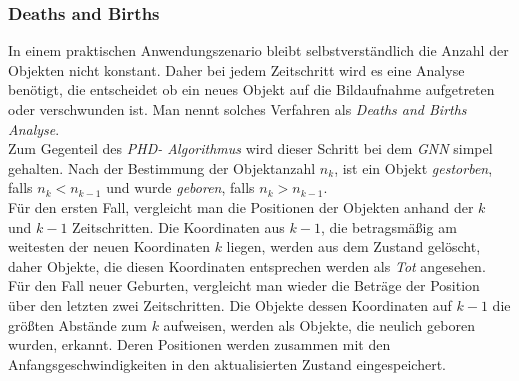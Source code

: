 \documentclass[10pt,a4paper]{article}
\begin{document}
\subsubsection{Deaths and Births}\label{subsub:GNNDeathBirth}
In einem praktischen Anwendungszenario bleibt selbstverständlich die Anzahl der Objekten nicht konstant. Daher bei jedem Zeitschritt wird es eine Analyse benötigt, die entscheidet ob ein neues Objekt auf die Bildaufnahme aufgetreten  oder verschwunden ist. Man nennt solches Verfahren als \textit{Deaths and Births Analyse}.\\
Zum Gegenteil des \textit{PHD- Algorithmus} wird dieser Schritt bei dem \textit{GNN } simpel gehalten. Nach der Bestimmung der Objektanzahl $n_k$, ist ein Objekt \textit{gestorben}, falls $n_k < n_{k-1}$ und wurde \textit{geboren}, falls $n_k > n_{k-1}$.\\
Für den ersten Fall, vergleicht man die Positionen der Objekten anhand der $k$ und $k-1$ Zeitschritten. Die Koordinaten aus $k-1$, die betragsmäßig am weitesten der neuen Koordinaten $k$ liegen, werden aus dem Zustand gelöscht, daher Objekte, die diesen Koordinaten entsprechen werden als \textit{Tot} angesehen.\\
Für den Fall neuer Geburten, vergleicht man wieder die Beträge der Position über den letzten zwei Zeitschritten. Die Objekte dessen Koordinaten auf $k-1$ die größten Abstände zum $k$ aufweisen, werden als Objekte, die neulich geboren wurden, erkannt. Deren Positionen werden zusammen mit den Anfangsgeschwindigkeiten in den aktualisierten Zustand eingespeichert.
\end{document}
